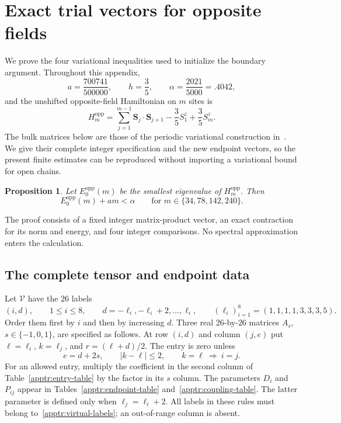\documentclass[11pt]{article}
\newtheorem{proposition}[theorem]{Proposition}
\theoremstyle{remark}
\numberwithin{equation}{section}
\begin{document}
\section{Exact trial vectors for opposite fields}\label{app:trials}

We prove the four variational inequalities used to initialize the
boundary argument.  Throughout this appendix,
\[
 a=\frac{700741}{500000},\qquad h=\frac35,\qquad
 \alpha=\frac{2021}{5000}=.4042,
\]
and the unshifted opposite-field Hamiltonian on $m$ sites is
\begin{equation}\label{apptr:hamiltonian}
 H_m^{\mathrm{opp}}
 =\sum_{j=1}^{m-1}\mathbf S_j\cdot\mathbf S_{j+1}
   -\frac35S_1^z+\frac35S_m^z.
\end{equation}
The bulk matrices below are those of the periodic variational
construction in~\cite[Section ``Two variational inputs'']{periodic}.
We give their complete integer specification and the new endpoint
vectors, so the present finite estimates can be reproduced without
importing a variational bound for open chains.

\begin{proposition}\label{apptr:bound}
Let $E_0^{\mathrm{opp}}(m)$ be the smallest eigenvalue of
$H_m^{\mathrm{opp}}$.  Then
\begin{equation}\label{apptr:four-bounds}
 E_0^{\mathrm{opp}}(m)+am<\alpha
 \qquad\text{for }m\in\{34,78,142,240\}.
\end{equation}
\end{proposition}

The proof consists of a fixed integer matrix-product vector, an exact
contraction for its norm and energy, and four integer comparisons.
No spectral approximation enters the calculation.

\subsection{The complete tensor and endpoint data}

Let $\mathcal V$ have the $26$ labels
\begin{equation}\label{apptr:virtual-labels}
 (i,d),\qquad 1\le i\le8,\qquad
 d=-\ell_i,-\ell_i+2,\ldots,\ell_i,
 \qquad(\ell_i)_{i=1}^8=(1,1,1,1,3,3,3,5).
\end{equation}
Order them first by $i$ and then by increasing $d$.  Three real
$26$-by-$26$ matrices $A_s$, $s\in\{-1,0,1\}$, are specified as follows.
At row $(i,d)$ and column $(j,e)$ put
$\ell=\ell_i$, $k=\ell_j$, and $r=(\ell+d)/2$.
The entry is zero unless
\begin{equation}\label{apptr:support}
 e=d+2s,\qquad |k-\ell|\le2,\qquad
 k=\ell\ \Longrightarrow\ i=j.
\end{equation}
For an allowed entry, multiply the coefficient in the second column of
Table~\ref{apptr:entry-table} by the factor in its $s$ column.
The parameters $D_i$ and $P_{ij}$ appear in
Tables~\ref{apptr:endpoint-table} and~\ref{apptr:coupling-table}.
The latter parameter is defined only when $\ell_j=\ell_i+2$.
All labels in these rules must belong to~\eqref{apptr:virtual-labels};
an out-of-range column is absent.
\end{document}
